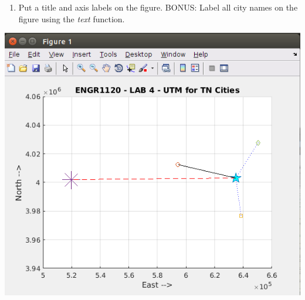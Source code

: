 \documentclass[11pt]{article}
\begin{document}
\begin{description}
\begin{enumerate}
	\item Put a title and axis labels on the figure.  BONUS: Label all city names on the figure using the {\it text} function.
	
        \end{enumerate}
    
    \includegraphics[scale=1]{lab4_fig2.png}
    
    \end{description}
 
\end{document}
